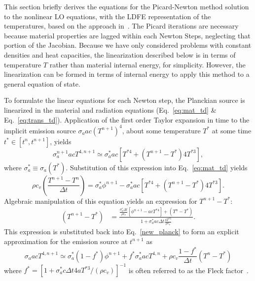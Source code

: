 This section briefly derives the equations for the Picard-Newton method solution to the nonlinear LO equations,
with the LDFE representation of the temperatures, based on the approach in~\cite{morel_ldtrt}.  The Picard
iterations are necessary because material properties are lagged within each Newton Steps, neglecting that portion
of the Jacobian.
Because we have only considered problems with constant densities and heat capacities, the
linearization described below is in terms of temperature $T$ rather than material internal
energy, for simplicity. However, the linearization can be formed in terms of internal energy
to apply this method to a general equation of state.

To formulate the linear equations for each Newton step, the Planckian source is linearized in the material and radiation equations (Eq.~\eqref{eq:mat_td}
\& Eq.~\eqref{eq:trans_td}). 
Application of the first order Taylor expansion in time to the
implicit emission source $\sigma_a a c (T^{n+1})^4$, about some temperature $T^*$ at some
time $t^*\in[t^{n},t^{n+1}]$, yields
\begin{equation}\label{new_planck}
    \sigma_a^{n+1} a c T^{4,n+1} \simeq \sigma_a^* a c \left[T^{*4} + (T^{n+1} - T^*) 4T^{*3} \right],
\end{equation}
where $\sigma_a^*\equiv\sigma_a(T^*)$.  Substitution of this expression into Eq.~\eqref{eq:mat_td} yields
\begin{equation}
    \rho c_v \left( \frac{T^{n+1} - T^{n}}{\Delta t} \right) = \sigma_a^* \phi^{n+1} -
    \sigma_a^* a c \left[ T^{*4} +  (T^{n+1} - T^*) 4T^{*3} \right].
\end{equation}
Algebraic manipulation of this equation yields an expression for $T^{n+1} - T^{*}$:
\begin{align*}
\left( T^{n+1} - T^* \right) &= \frac{ {\displaystyle \frac{\sigma_a^* \Delta t}{\rho
c_v}}  \left[ \phi^{n+1} -  a c T^{*4} \right] + (T^n - T^*) }{1 +
        \sigma_a^* a c \Delta t\frac{\displaystyle 4
T^{*3}}{\displaystyle \rho c_v } }.
\end{align*}
This expression is substituted back into Eq.~\eqref{new_planck} to form
an explicit approximation for the emission source at $t^{n+1}$ as
\begin{equation}\label{t_next1}
    \sigma_a a c T^{4,n+1} \simeq \sigma_a^* (1 -f^*) \phi^{n+1}
    + f^* \sigma_a^* a c T^{4,n} + \rho c_v\frac{1-f^*}{\Delta t} (T^n - T^*)
\end{equation}
where $f^* = [1 + \sigma_a^* c \Delta t 4 a T^{*3}/(\rho c_v)]^{-1}$ is often referred to
as the Fleck factor~\cite{fnc}. 

